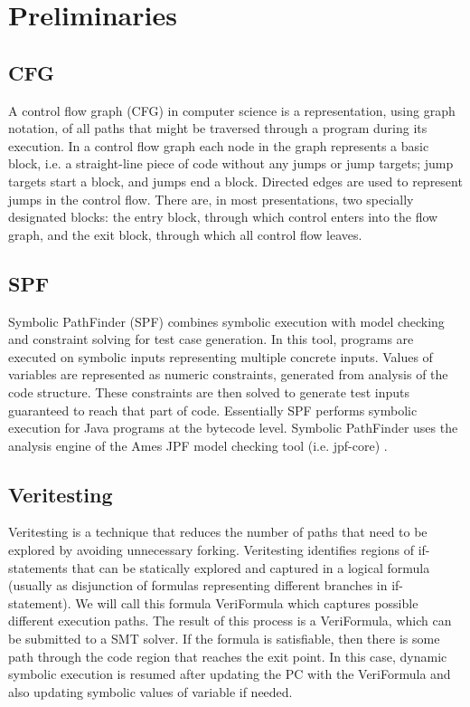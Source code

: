 \section{Preliminaries}
\subsection{CFG}
A control flow graph (CFG) in computer science is a representation, using graph notation, of all paths that might be traversed through a program during its execution.
In a control flow graph each node in the graph represents a basic block, i.e. a straight-line piece of code without any jumps or jump targets; jump targets start a block, and jumps end a block. Directed edges are used to represent jumps in the control flow. There are, in most presentations, two specially designated blocks: the entry block, through which control enters into the flow graph, and the exit block, through which all control flow leaves.

\subsection{SPF}
Symbolic PathFinder (SPF) \cite{spf} combines symbolic execution with model checking and constraint solving for test case generation. In this tool, programs are executed on symbolic inputs representing multiple concrete inputs. Values of variables are represented as numeric constraints, generated from analysis of the code structure. These constraints are then solved to generate test inputs guaranteed to reach that part of code. Essentially SPF performs symbolic execution for Java programs at the bytecode level. Symbolic PathFinder uses the analysis engine of the Ames JPF model checking tool (i.e. jpf-core) \cite{jpf}.


\subsection{Veritesting}
Veritesting\cite{veritesting} is a technique that reduces the number of paths that need to be explored by avoiding unnecessary forking. 
%
Veritesting identifies regions of if-statements that can be statically explored and captured in a logical formula (usually as disjunction of formulas representing different branches in if-statement). 
%
We will call this formula VeriFormula which captures possible different execution paths. 
%
The result of this process is a VeriFormula, which can be submitted to a SMT solver. 
%
If the formula is satisfiable, then there is some path through the code region that reaches the exit point. In this case, dynamic symbolic execution is resumed after updating the PC with the VeriFormula and also updating symbolic values of variable if needed. 

